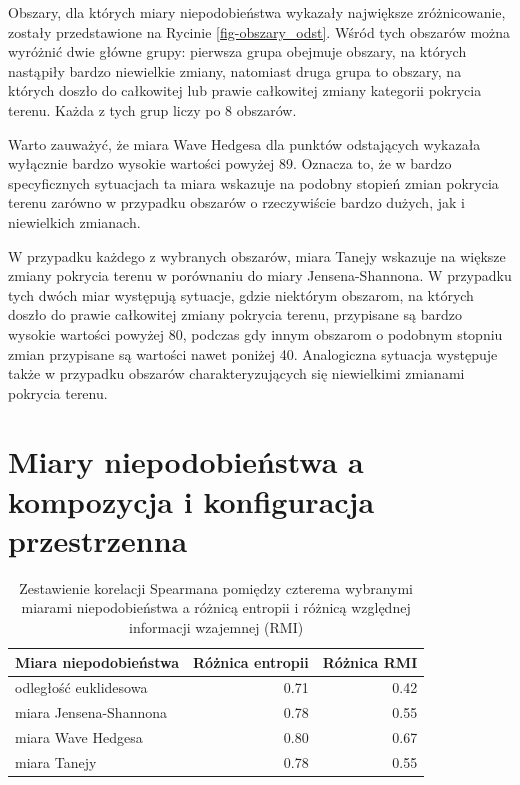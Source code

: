 \documentclass{amuthesis}
\begin{document}
Obszary, dla których miary niepodobieństwa wykazały największe
zróżnicowanie, zostały przedstawione na Rycinie \ref{fig-obszary_odst}.
Wśród tych obszarów można wyróżnić dwie główne grupy: pierwsza grupa
obejmuje obszary, na których nastąpiły bardzo niewielkie zmiany,
natomiast druga grupa to obszary, na których doszło do całkowitej lub
prawie całkowitej zmiany kategorii pokrycia terenu. Każda z tych grup
liczy po 8 obszarów.

Warto zauważyć, że miara Wave Hedgesa dla punktów odstających wykazała
wyłącznie bardzo wysokie wartości powyżej 89. Oznacza to, że w bardzo
specyficznych sytuacjach ta miara wskazuje na podobny stopień zmian
pokrycia terenu zarówno w przypadku obszarów o rzeczywiście bardzo
dużych, jak i niewielkich zmianach.

W przypadku każdego z wybranych obszarów, miara Tanejy wskazuje na
większe zmiany pokrycia terenu w porównaniu do miary Jensena-Shannona. W
przypadku tych dwóch miar występują sytuacje, gdzie niektórym obszarom,
na których doszło do prawie całkowitej zmiany pokrycia terenu,
przypisane są bardzo wysokie wartości powyżej 80, podczas gdy innym
obszarom o podobnym stopniu zmian przypisane są wartości nawet poniżej
40. Analogiczna sytuacja występuje także w przypadku obszarów
charakteryzujących się niewielkimi zmianami pokrycia terenu.

\hypertarget{miary-niepodobieux144stwa-a-kompozycja-i-konfiguracja-przestrzenna}{%
\section{Miary niepodobieństwa a kompozycja i konfiguracja
przestrzenna}\label{miary-niepodobieux144stwa-a-kompozycja-i-konfiguracja-przestrzenna}}

\hypertarget{tbl-cztery_miary_ent_relmutinf}{}
\begin{table}
\caption{\label{tbl-cztery_miary_ent_relmutinf}Zestawienie korelacji Spearmana pomiędzy czterema wybranymi miarami
niepodobieństwa a różnicą entropii i różnicą względnej informacji
wzajemnej (RMI) }\tabularnewline

\centering
\begin{tabular}{lrr}
\toprule
Miara niepodobieństwa & Różnica entropii & Różnica RMI\\
\midrule
odległość euklidesowa & 0.71 & 0.42\\
miara Jensena-Shannona & 0.78 & 0.55\\
miara Wave Hedgesa & 0.80 & 0.67\\
miara Tanejy & 0.78 & 0.55\\
\bottomrule
\end{tabular}
\end{table}
\end{document}
